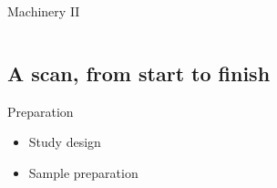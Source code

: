 \documentclass[aspectratio=169,10pt,draft]{beamer}
\begin{document}
\begin{frame}{Machinery II}
	\begin{columns}
		\hfill
		\begin{column}{0.4\linewidth}
			
		\end{column}
		\hfill		
		\begin{column}{0.4\linewidth}
			
		\end{column}
		\hfill
	\end{columns}
\end{frame}


\subsection{A scan, from start to finish}
\begin{frame}{Preparation}
	\begin{itemize}
		\item Study design
		\item Sample preparation
	\end{itemize}
\end{frame}
\end{document}
